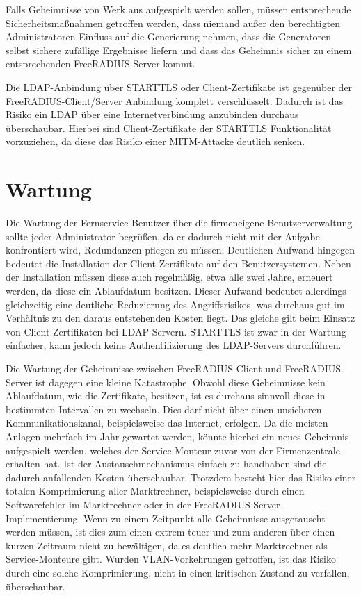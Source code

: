 \documentclass[11pt,a4paper]{report}
\begin{document}
Falls Geheimnisse von Werk aus aufgespielt werden sollen, müssen entsprechende Sicherheitsmaßnahmen getroffen werden, dass niemand außer den berechtigten Administratoren Einfluss auf die Generierung nehmen, dass die Generatoren selbst sichere zufällige Ergebnisse liefern und dass das Geheimnis sicher zu einem entsprechenden FreeRADIUS-Server kommt.

Die LDAP-Anbindung über STARTTLS oder Client-Zertifikate ist gegenüber der FreeRADIUS-Client/Server Anbindung komplett verschlüsselt. Dadurch ist das Risiko ein LDAP über eine Internetverbindung anzubinden durchaus überschaubar. Hierbei sind Client-Zertifikate der STARTTLS Funktionalität vorzuziehen, da diese das Risiko einer MITM-Attacke deutlich senken.

\section{Wartung}

Die Wartung der Fernservice-Benutzer über die firmeneigene Benutzerverwaltung sollte jeder Administrator begrüßen, da er dadurch nicht mit der Aufgabe konfrontiert wird, Redundanzen pflegen zu müssen. Deutlichen Aufwand hingegen bedeutet die Installation der Client-Zertifikate auf den Benutzersystemen. Neben der Installation müssen diese auch regelmäßig, etwa alle zwei Jahre, erneuert werden, da diese ein Ablaufdatum besitzen. Dieser Aufwand bedeutet allerdings gleichzeitig eine deutliche Reduzierung des Angriffsrisikos, was durchaus gut im Verhältnis zu den daraus entstehenden Kosten liegt. Das gleiche gilt beim Einsatz von Client-Zertifikaten bei LDAP-Servern. STARTTLS ist zwar in der Wartung einfacher, kann jedoch keine Authentifizierung des LDAP-Servers durchführen. 

Die Wartung der Geheimnisse zwischen FreeRADIUS-Client und FreeRADIUS-Server ist dagegen eine kleine Katastrophe. Obwohl diese Geheimnisse kein Ablaufdatum, wie die Zertifikate, besitzen, ist es durchaus sinnvoll diese in bestimmten Intervallen zu wechseln. Dies darf nicht über einen unsicheren Kommunikationskanal, beispielsweise das Internet, erfolgen. Da die meisten Anlagen mehrfach im Jahr gewartet werden, könnte hierbei ein neues Geheimnis aufgespielt werden, welches der Service-Monteur zuvor von der Firmenzentrale erhalten hat. Ist der Austauschmechanismus einfach zu handhaben sind die dadurch anfallenden Kosten überschaubar. Trotzdem besteht hier das Risiko einer totalen Komprimierung aller Marktrechner, beispielsweise durch einen Softwarefehler im Marktrechner oder in der FreeRADIUS-Server Implementierung. Wenn zu einem Zeitpunkt alle Geheimnisse ausgetauscht werden müssen, ist dies zum einen extrem teuer und zum anderen über einen kurzen Zeitraum nicht zu bewältigen, da es deutlich mehr Marktrechner als Service-Monteure gibt. Wurden VLAN-Vorkehrungen getroffen, ist das Risiko durch eine solche Komprimierung, nicht in einen kritischen Zustand zu verfallen, überschaubar.
\end{document}
